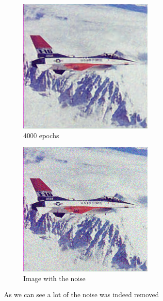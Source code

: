 \documentclass[12pt]{article}
\begin{document}
\begin{figure}[h]
  \centering
  \begin{subfigure}[b]{0.4\linewidth}
    \includegraphics[width=\linewidth]{result2d.png}
    \caption{4000 epochs}
  \end{subfigure}
  \begin{subfigure}[b]{0.4\linewidth}
    \includegraphics[width=\linewidth]{noisy2d.png}
    \caption{Image with the noise}
  \end{subfigure}
  \caption{As we can see a lot of the noise was indeed removed}
  \label{fig:comparing_epoch_noise_2d}
\end{figure}
\end{document}
